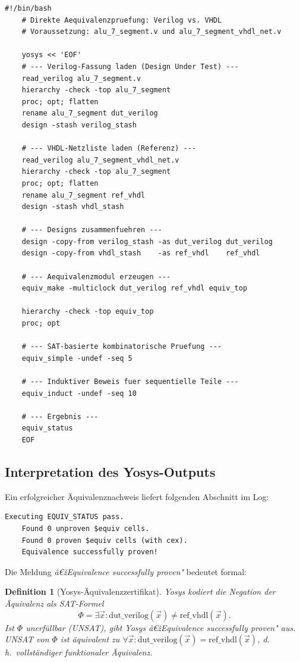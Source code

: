 ﻿\documentclass[12pt,a4paper]{report}
\newtheorem{definition}{Definition}[section]
\begin{document}
\begin{lstlisting}[style=bashstyle, caption={Yosys-Äquivalenzprüfung: Verilog vs.\ VHDL-Netzliste}]
	#!/bin/bash
	# Direkte Aequivalenzpruefung: Verilog vs. VHDL
	# Voraussetzung: alu_7_segment.v und alu_7_segment_vhdl_net.v
	
	yosys << 'EOF'
	# --- Verilog-Fassung laden (Design Under Test) ---
	read_verilog alu_7_segment.v
	hierarchy -check -top alu_7_segment
	proc; opt; flatten
	rename alu_7_segment dut_verilog
	design -stash verilog_stash
	
	# --- VHDL-Netzliste laden (Referenz) ---
	read_verilog alu_7_segment_vhdl_net.v
	hierarchy -check -top alu_7_segment
	proc; opt; flatten
	rename alu_7_segment ref_vhdl
	design -stash vhdl_stash
	
	# --- Designs zusammenfuehren ---
	design -copy-from verilog_stash -as dut_verilog dut_verilog
	design -copy-from vhdl_stash    -as ref_vhdl    ref_vhdl
	
	# --- Aequivalenzmodul erzeugen ---
	equiv_make -multiclock dut_verilog ref_vhdl equiv_top
	
	hierarchy -check -top equiv_top
	proc; opt
	
	# --- SAT-basierte kombinatorische Pruefung ---
	equiv_simple -undef -seq 5
	
	# --- Induktiver Beweis fuer sequentielle Teile ---
	equiv_induct -undef -seq 10
	
	# --- Ergebnis ---
	equiv_status
	EOF
\end{lstlisting}

\subsection{Interpretation des Yosys-Outputs}

Ein erfolgreicher Äquivalenznachweis liefert folgenden Abschnitt im Log:

\begin{lstlisting}[style=bashstyle]
	Executing EQUIV_STATUS pass.
	Found 0 unproven $equiv cells.
	Found 0 proven $equiv cells (with cex).
	Equivalence successfully proven!
\end{lstlisting}

Die Meldung \textit{â€žEquivalence successfully proven"} bedeutet formal:

\begin{definition}[Yosys-Äquivalenzzertifikat]
	Yosys kodiert die Negation der Äquivalenz als SAT-Formel
	\[
	\Phi = \exists \vec{x} : \mathrm{dut\_verilog}(\vec{x}) \neq \mathrm{ref\_vhdl}(\vec{x}).
	\]
	Ist $\Phi$ unerfüllbar (UNSAT), gibt Yosys \textit{â€žEquivalence successfully
		proven"} aus.  UNSAT von $\Phi$ ist äquivalent zu
	$\forall \vec{x} : \mathrm{dut\_verilog}(\vec{x}) = \mathrm{ref\_vhdl}(\vec{x})$,
	d.\,h.\ vollständiger funktionaler Äquivalenz.
\end{definition}
\end{document}
